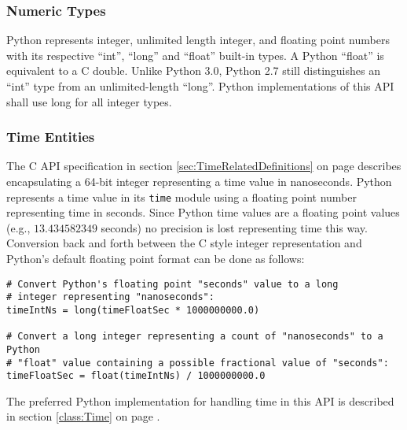 \subsubsection{Numeric Types}\label{sec:PythonNumericTypes}

Python represents integer, unlimited length integer, and floating point numbers
with its respective ``int'', ``long'' and ``float'' built-in types. A Python
``float'' is equivalent to a C double. Unlike Python 3.0, Python 2.7 still
distinguishes an ``int'' type from an unlimited-length ``long''. Python
implementations of this API shall use long for all integer types.

\subsubsection{Time Entities}\label{sec:PythonTimeEntities}

The C API specification in section \ref{sec:TimeRelatedDefinitions} on page
\pageref{sec:TimeRelatedDefinitions} describes encapsulating a 64-bit integer
representing a time value in nanoseconds. Python represents a time value in its
\texttt{time} module using a floating point number representing time in seconds.
Since Python time values are a floating point values (e.g., $13.434582349$
seconds) no precision is lost representing time this way. Conversion back and
forth between the C style integer representation and Python's default floating
point format can be done as follows:

\begin{center}\begin{minipage}{.95\linewidth}\begin{lstlisting}
# Convert Python's floating point "seconds" value to a long
# integer representing "nanoseconds":
timeIntNs = long(timeFloatSec * 1000000000.0)

# Convert a long integer representing a count of "nanoseconds" to a Python
# "float" value containing a possible fractional value of "seconds":
timeFloatSec = float(timeIntNs) / 1000000000.0
\end{lstlisting}\end{minipage}\end{center}

The preferred Python implementation for handling time in this API is described
in section \ref{class:Time} on page \pageref{class:Time}.

